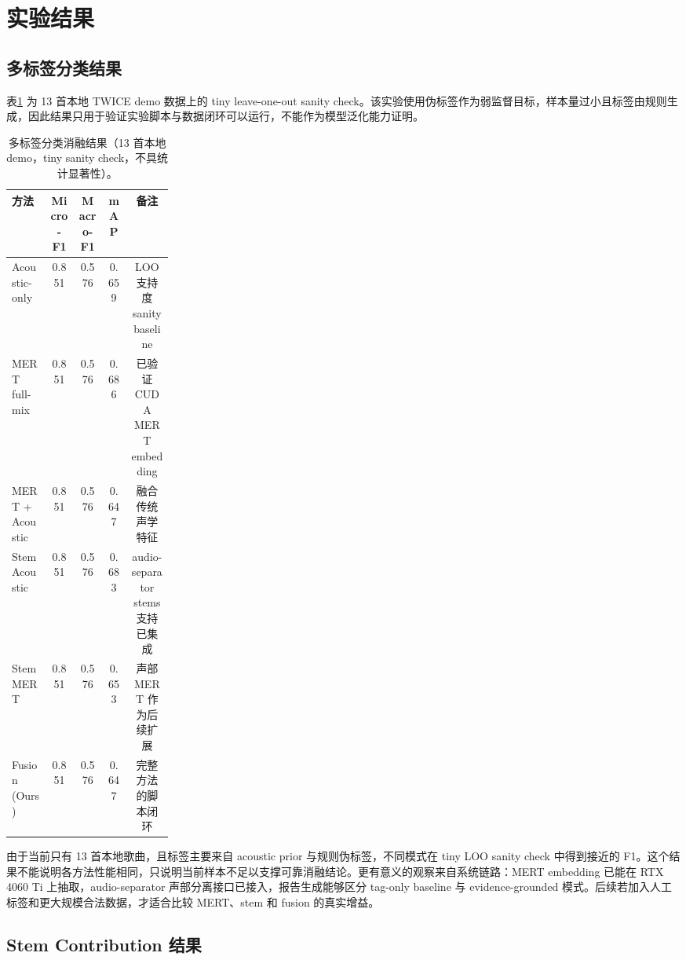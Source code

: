 \documentclass[UTF8,zihao=-4]{ctexart}
\begin{document}
\section{实验结果}

\subsection{多标签分类结果}

表\ref{tab:classification} 为 13 首本地 TWICE demo 数据上的 tiny leave-one-out sanity check。该实验使用伪标签作为弱监督目标，样本量过小且标签由规则生成，因此结果只用于验证实验脚本与数据闭环可以运行，不能作为模型泛化能力证明。

\begin{table}[H]
\centering
\caption{多标签分类消融结果（13 首本地 demo，tiny sanity check，不具统计显著性）。}
\label{tab:classification}
\small
\begin{tabular}{p{0.24\linewidth}cccc}
\toprule
方法 & Micro-F1 & Macro-F1 & mAP & 备注 \\
\midrule
Acoustic-only & 0.851 & 0.576 & 0.659 & LOO 支持度 sanity baseline \\
MERT full-mix & 0.851 & 0.576 & 0.686 & 已验证 CUDA MERT embedding \\
MERT + Acoustic & 0.851 & 0.576 & 0.647 & 融合传统声学特征 \\
Stem Acoustic & 0.851 & 0.576 & 0.683 & audio-separator stems 支持已集成 \\
Stem MERT & 0.851 & 0.576 & 0.653 & 声部 MERT 作为后续扩展 \\
Fusion (Ours) & 0.851 & 0.576 & 0.647 & 完整方法的脚本闭环 \\
\bottomrule
\end{tabular}
\end{table}

由于当前只有 13 首本地歌曲，且标签主要来自 acoustic prior 与规则伪标签，不同模式在 tiny LOO sanity check 中得到接近的 F1。这个结果不能说明各方法性能相同，只说明当前样本不足以支撑可靠消融结论。更有意义的观察来自系统链路：MERT embedding 已能在 RTX 4060 Ti 上抽取，audio-separator 声部分离接口已接入，报告生成能够区分 tag-only baseline 与 evidence-grounded 模式。后续若加入人工标签和更大规模合法数据，才适合比较 MERT、stem 和 fusion 的真实增益。

\subsection{Stem Contribution 结果}
\end{document}

